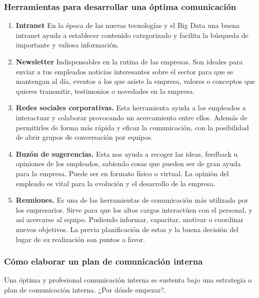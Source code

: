 \subsubsection{Herramientas para desarrollar una óptima comunicación}
\begin{enumerate}
    \item \textbf{Intranet} En la época de las nuevas tecnologías y el Big Data una buena intranet ayuda a establecer contenido categorizado y facilita la búsqueda de importante y valiosa información.
    \item \textbf{Newsletter} Indispensables en la rutina de las empresas. Son ideales para enviar a tus empleados noticias interesantes sobre el sector para que se mantengan al día, eventos a los que asiste la empresa, valores o conceptos que quieres transmitir, testimonios o novedades en la empresa.
    \item \textbf{Redes sociales corporativas.} Esta herramienta ayuda a los empleados a interactuar y colaborar provocando un acercamiento entre ellos. Además de permitirles de forma más rápida y eficaz la comunicación, con la posibilidad de abrir grupos de conversación por equipos.
    \item \textbf{Buzón de sugerencias. } Esta nos ayuda a recoger las ideas, feedback u opiniones de los empleados, sabiendo cosas que pueden ser de gran ayuda para la empresa. Puede ser en formato físico o virtual. La opinión del empleado es vital para la evolución y el desarrollo de la empresa.
    \item \textbf{Reuniones. } Es una de las herramientas de comunicación más utilizada por los empresarios. Sirve para que los altos cargos interactúen con el personal, y así acercarse al equipo. Pudiendo informar, capacitar, motivar o coordinar nuevos objetivos. La previa planificación de estas y la buena decisión del lugar de su realización son puntos a favor.
\end{enumerate}

\subsubsection{Cómo elaborar un plan de comunicación interna}
Una óptima y profesional comunicación interna se sustenta bajo una estrategia o plan de comunicación
interna. ¿Por dónde empezar?.


